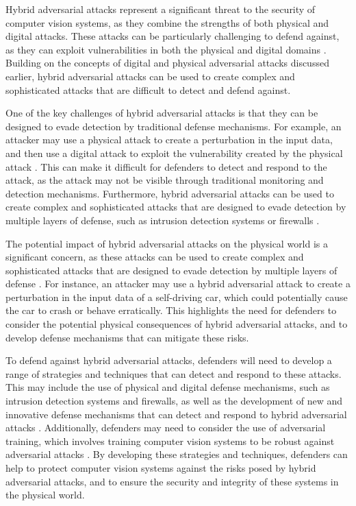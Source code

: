 \documentclass[11pt]{article}
\begin{document}
Hybrid adversarial attacks represent a significant threat to the security of computer vision systems, as they combine the strengths of both physical and digital attacks. These attacks can be particularly challenging to defend against, as they can exploit vulnerabilities in both the physical and digital domains \cite{ref34}. Building on the concepts of digital and physical adversarial attacks discussed earlier, hybrid adversarial attacks can be used to create complex and sophisticated attacks that are difficult to detect and defend against.

One of the key challenges of hybrid adversarial attacks is that they can be designed to evade detection by traditional defense mechanisms. For example, an attacker may use a physical attack to create a perturbation in the input data, and then use a digital attack to exploit the vulnerability created by the physical attack \cite{ref46}. This can make it difficult for defenders to detect and respond to the attack, as the attack may not be visible through traditional monitoring and detection mechanisms. Furthermore, hybrid adversarial attacks can be used to create complex and sophisticated attacks that are designed to evade detection by multiple layers of defense, such as intrusion detection systems or firewalls \cite{ref54}.

The potential impact of hybrid adversarial attacks on the physical world is a significant concern, as these attacks can be used to create complex and sophisticated attacks that are designed to evade detection by multiple layers of defense \cite{ref55}. For instance, an attacker may use a hybrid adversarial attack to create a perturbation in the input data of a self-driving car, which could potentially cause the car to crash or behave erratically. This highlights the need for defenders to consider the potential physical consequences of hybrid adversarial attacks, and to develop defense mechanisms that can mitigate these risks.

To defend against hybrid adversarial attacks, defenders will need to develop a range of strategies and techniques that can detect and respond to these attacks. This may include the use of physical and digital defense mechanisms, such as intrusion detection systems and firewalls, as well as the development of new and innovative defense mechanisms that can detect and respond to hybrid adversarial attacks \cite{ref38}. Additionally, defenders may need to consider the use of adversarial training, which involves training computer vision systems to be robust against adversarial attacks \cite{ref56}. By developing these strategies and techniques, defenders can help to protect computer vision systems against the risks posed by hybrid adversarial attacks, and to ensure the security and integrity of these systems in the physical world.
\end{document}
